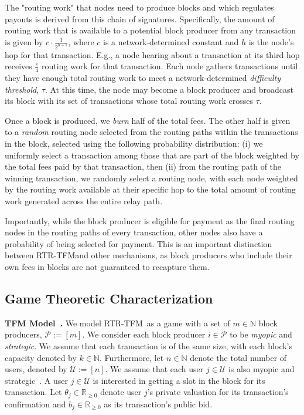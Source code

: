 \documentclass[sigconf,anonymous]{aamas}
\newcommand{\ourTFM}{\textsc{RTR-TFM}}
\renewcommand{\paragraph}[1]{\smallskip\noindent\textbf{#1}}
\begin{document}
The "routing work" that nodes need to produce blocks and which regulates payouts is derived from this chain of signatures. Specifically, the amount of routing work that is available to a potential block producer from any transaction is given by $c\cdot \frac{1}{2^{h-1}}$, where $c$ is a network-determined constant and $h$ is the node's hop for that transaction. E.g., a node hearing about a transaction at its third hop receives $\frac{c}{4}$ routing work for that transaction. Each node gathers transactions until they have enough total routing work to meet a network-determined \textit{difficulty} \textit{threshold}, $\tau$. At this time, the node may become a block producer and broadcast its block with its set of transactions whose total routing work crosses $\tau$.

Once a block is produced, we \emph{burn} half of the total fees. The other half is given to a \emph{random} routing node selected from the routing paths within the transactions in the block, selected using the following probability distribution: (i) we uniformly select a transaction among those that are part of the block weighted by the total fees paid by that transaction, then (ii) from the routing path of the winning transaction, we randomly select a routing node, with each node weighted by the routing work available at their specific hop to the total amount of routing work generated across the entire relay path.

Importantly, while the block producer is eligible for payment as the final routing nodes in the routing paths of every transaction, other nodes also have a probability of being selected for payment. This is an important distinction between \ourTFM and other mechanisms, as block producers who include their own fees in blocks are not guaranteed to recapture them.

\subsection{Game Theoretic Characterization}

\paragraph{TFM Model~\cite{roughgarden2021,roughgarden2024transaction}.} We model \ourTFM\ as a game with a set of $m\in\mathbb{N}$ block producers, $\mathcal{P}:=[m]$. We consider each block producer $i\in \mathcal{P}$ to be \emph{myopic} and \emph{strategic}. We assume that each transaction is of the same size, with each block's capacity denoted by $k \in \mathbb{N}$. Furthermore, let $n\in\mathbb{N}$ denote the total number of users, denoted by $\mathcal{U}:=[n]$. We assume that each user $j\in\mathcal{U}$ is also myopic and strategic~\cite{roughgarden2021,ferreira2021dynamic,chung2023foundations,gafni2024barriers,damle2024designing}. A user $j\in\mathcal{U}$ is interested in getting a slot in the block for its transaction. Let $\theta_{j}\in \mathbb{R}_{\geq 0}$ denote user $j$'s private valuation for its transaction's confirmation and $b_j \in \mathbb{R}_{\geq 0}$ as its transaction's public bid.
\end{document}
